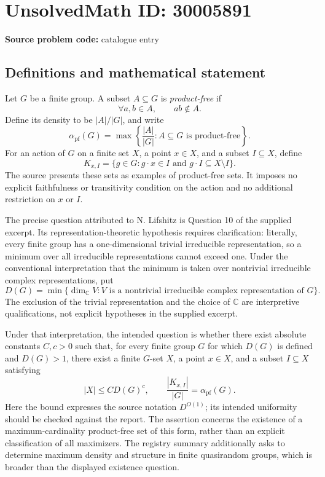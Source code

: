 \documentclass[11pt]{article}
\newcommand{\C}{\mathbb{C}}
\begin{document}
\section*{UnsolvedMath ID: 30005891}
\textbf{Source problem code:} catalogue entry
\subsection{Definitions and mathematical statement}
Let \(G\) be a finite group. A subset \(A\subseteq G\) is \emph{product-free} if
\[
\forall a,b\in A,\qquad ab\notin A.
\]
Define its density to be \(|A|/|G|\), and write
\[
\alpha_{\mathrm{pf}}(G)=\max\left\{\frac{|A|}{|G|}:A\subseteq G\text{ is product-free}\right\}.
\]
For an action of \(G\) on a finite set \(X\), a point \(x\in X\), and a subset \(I\subseteq X\), define
\[
K_{x,I}=\{g\in G:g\cdot x\in I\text{ and }g\cdot I\subseteq X\setminus I\}.
\]
The source presents these sets as examples of product-free sets. It imposes no explicit faithfulness or transitivity condition on the action and no additional restriction on \(x\) or \(I\).

The precise question attributed to N. Lifshitz is Question 10 of the supplied excerpt. Its representation-theoretic hypothesis requires clarification: literally, every finite group has a one-dimensional trivial irreducible representation, so a minimum over all irreducible representations cannot exceed one. Under the conventional interpretation that the minimum is taken over nontrivial irreducible complex representations, put
\[
D(G)=\min\{\dim_{\C}V:V\text{ is a nontrivial irreducible complex representation of }G\}.
\]
The exclusion of the trivial representation and the choice of \(\C\) are interpretive qualifications, not explicit hypotheses in the supplied excerpt.

Under that interpretation, the intended question is whether there exist absolute constants \(C,c>0\) such that, for every finite group \(G\) for which \(D(G)\) is defined and \(D(G)>1\), there exist a finite \(G\)-set \(X\), a point \(x\in X\), and a subset \(I\subseteq X\) satisfying
\[
|X|\leq C D(G)^c,
\qquad
\frac{|K_{x,I}|}{|G|}=\alpha_{\mathrm{pf}}(G).
\]
Here the bound expresses the source notation \(D^{O(1)}\); its intended uniformity should be checked against the report. The assertion concerns the existence of a maximum-cardinality product-free set of this form, rather than an explicit classification of all maximizers. The registry summary additionally asks to determine maximum density and structure in finite quasirandom groups, which is broader than the displayed existence question.
\end{document}
